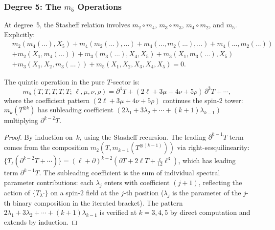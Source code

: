 \subsubsection{Degree 5: The $m_5$ Operations}

At degree~5, the Stasheff relation involves $m_2 \circ m_4$,
$m_3 \circ m_3$, $m_4 \circ m_2$, and $m_5$. Explicitly:
\begin{equation}
\label{eq:w3-stasheff-5}
\begin{split}
&m_2(m_4(\ldots), X_5) + m_4(m_2(\ldots), \ldots)
+ m_4(\ldots, m_2(\ldots), \ldots) + m_4(\ldots, m_2(\ldots))\\
&+ m_2(X_1, m_4(\ldots))
+ m_3(m_3(\ldots), X_4, X_5) + m_3(X_1, m_3(\ldots), X_5)\\
&+ m_3(X_1, X_2, m_3(\ldots)) + m_5(X_1, X_2, X_3, X_4, X_5) = 0.
\end{split}
\end{equation}

\begin{theorem}
\label{thm:w3-m5-TTTTT}
The quintic operation in the pure $T$-sector is:
\begin{equation}
\label{eq:w3-m5-TTTTT}
m_5(T,T,T,T,T;\,\ell,\mu,\nu,\rho)
= \partial^4 T + (2\ell + 3\mu + 4\nu + 5\rho)\,\partial^3 T + \cdots,
\end{equation}
where the coefficient pattern $(2\ell + 3\mu + 4\nu + 5\rho)$
continues the spin-$2$ tower: $m_k(T^{\otimes k})$ has subleading
coefficient $(2\lambda_1 + 3\lambda_2 + \cdots + (k+1)\lambda_{k-1})$
multiplying $\partial^{k-2} T$.
\end{theorem}

\begin{proof}
By induction on~$k$, using the Stasheff recursion. The leading
$\partial^{k-1} T$ term comes from the composition $m_2(T, m_{k-1}(T^{\otimes(k-1)}))$
via right-sesquilinearity: $\{T_\ell (\partial^{k-2} T + \cdots)\} =
(\ell + \partial)^{k-2}(\partial T + 2\ell T + \tfrac{c}{12}\ell^3)$,
which has leading term $\partial^{k-1} T$. The subleading
coefficient is the sum of individual spectral parameter contributions:
each $\lambda_j$ enters with coefficient $(j+1)$, reflecting the
action of $\{T_\lambda \cdot\}$ on a spin-$2$ field at the $j$-th
position ($\lambda_j$ is the parameter of the $j$-th binary
composition in the iterated bracket). The pattern
$2\lambda_1 + 3\lambda_2 + \cdots + (k+1)\lambda_{k-1}$ is verified
at $k = 3, 4, 5$ by direct computation and extends by induction.
\end{proof}

